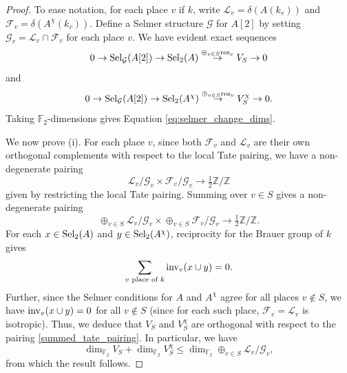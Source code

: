 \documentclass[10pt]{amsart}
\numberwithin{equation}{section}
\theoremstyle{remark}
\theoremstyle{definition}
\theoremstyle{definition}
\theoremstyle{definition}
\theoremstyle{definition}
\theoremstyle{definition}
\theoremstyle{definition}
\theoremstyle{definition}
\theoremstyle{definition}
\begin{document}
 

\begin{proof}
To ease notation, for each place $v$ if $k$, write 
$\mathcal{L}_v= \delta(A(k_v))$ and $ \mathcal{F}_v=  \delta(A^\chi(k_v)).$
Define a Selmer structure $\mathcal{G}$ for $A[2]$ by setting $\mathcal{G}_v=\mathcal{L}_v\cap \mathcal{F}_v$ for each place $v$. We have evident exact sequences 
\[0\to \textup{Sel}_\mathcal{G}(A[2])\to \textup{Sel}_2(A)\stackrel{\oplus_{v\in S}\textup{res}_v}{\to} V_S\to 0\]
and 
\[0\to \textup{Sel}_\mathcal{G}(A[2])\to \textup{Sel}_2(A^\chi)\stackrel{\oplus_{v\in S}\textup{res}_v}{\to} V_S^\chi\to 0.\]
Taking $\mathbb{F}_2$-dimensions gives Equation \eqref{eq:selmer_change_dims}.

We now prove (i). For each place $v$, since both $\mathcal{F}_v$ and $\mathcal{L}_v$ are their own orthogonal complements with respect to the local Tate pairing, we have a non-degenerate pairing
\[\mathcal{L}_v/\mathcal{G}_v\times  \mathcal{F}_v/\mathcal{G}_v\to \tfrac{1}{2}\mathbb{Z}/\mathbb{Z}\]
given by restricting the local Tate pairing. Summing over $v\in S$ gives a non-degenerate pairing
\begin{equation} \label{summed_tate_pairing}
\oplus_{v\in S}\mathcal{L}_v/\mathcal{G}_v \times \oplus_{v\in S}\mathcal{F}_v/\mathcal{G}_v\to \tfrac{1}{2}\mathbb{Z}/\mathbb{Z}.
\end{equation}
For each $x\in \textup{Sel}_2(A)$ and $y\in \textup{Sel}_2(A^\chi)$, reciprocity for the Brauer group of $k$ gives 
\[\sum_{v\textup{ place of }k}\textup{inv}_v(x\cup y)=0.\]
Further, since the Selmer conditions for $A$ and $A^\chi$ agree for all places $v\notin S$, we have $\textup{inv}_v(x\cup y)=0$ for all $v\notin S$ (since for each such place, $\mathcal{F}_v=\mathcal{L}_v$ is isotropic). Thus, we deduce that $V_S$ and $V_S^\chi$ are orthogonal with respect to the pairing \eqref{summed_tate_pairing}. In particular, we have 
\[\dim_{\mathbb{F}_2}V_S+\dim_{\mathbb{F}_2}V_S^\chi\leq \dim_{\mathbb{F}_2}\oplus_{v\in S}\mathcal{L}_v/\mathcal{G}_v,\]
from which the result follows.

\end{proof}
\end{document}
